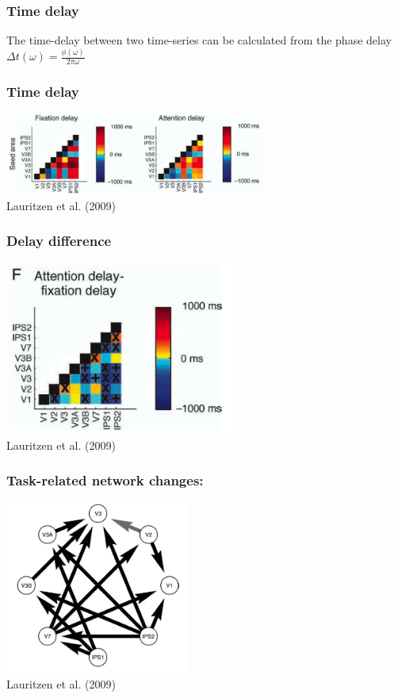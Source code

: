 \documentclass{beamer}
\begin{document}
\begin{frame}
\frametitle{Time delay}
The time-delay between two time-series can be calculated from the phase delay 
\\ 
\pause
\vspace{1cm}
$\Delta t (\omega) = \frac{\phi(\omega)}{2 \pi \omega}$
\end{frame}

\begin{frame}
\frametitle{Time delay}
\includegraphics[height=2.7cm]{figures/lauritzen6}
\\
\hfill 
Lauritzen et al. (2009)
\end{frame}

\begin{frame}
\frametitle{Delay difference}
\includegraphics[height=5.7cm]{figures/lauritzen7}
\\
\hfill 
Lauritzen et al. (2009)
\end{frame}

\begin{frame}
\frametitle{Task-related network changes:}
\includegraphics[height=5.7cm]{figures/lauritzen8}
\\
\hfill 
Lauritzen et al. (2009)
\end{frame}
\end{document}

